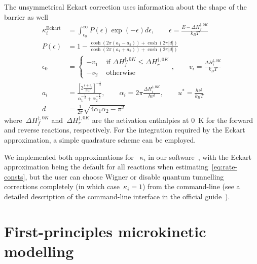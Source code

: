 The unsymmetrical Eckart correction uses information about the shape of the barrier as well
%
\begin{equation}
	\begin{split}
		\kappa_i^\text{Eckart}
		&= \int_{\epsilon_0}^\infty
		P(\epsilon) \exp \left(
		-\epsilon
		\right) d \epsilon,
		\qquad
		\epsilon
		= \frac{E - \Delta H^{\ddagger,
					0 K}_f}{k_B T} \\
		P(\epsilon)
		&= 1
		- \frac{
			\cosh \left(
			2 \pi (a_1 - a_2)
			\right)
			+ \cosh \left(
			2 \pi |d|
			\right)
		}{
			\cosh \left(
			2 \pi (a_1 + a_2)
			\right)
			+ \cosh \left(
			2 \pi |d|
			\right)
		} \\
		\epsilon_0 &= \begin{cases}
			-v_1 & \text{ if }
			\Delta H^{\ddagger,
					0 K}_f \le \Delta H^{\ddagger,
			0 K}_r                   \\
			-v_2 & \text{ otherwise}
		\end{cases},
		\qquad
		v_i
		= \frac{\Delta H^{\ddagger,
					0 K}_i}{k_B T} \\
		a_i
		&= \frac{
			\left[
				2
				\frac{
					\epsilon + v_i
				}{\pi u^*}
				\right]^{-\frac{1}{2}}
		}{
			\alpha_1^{-\frac{1}{2}}
			+ \alpha_2^{-\frac{1}{2}}
		},
		\qquad
		\alpha_i
		= 2 \pi \frac{
			\Delta H^{\ddagger,
					0 K}_i
		}{
			h \nu^\ddagger
		},
		\qquad
		u^*
		= \frac{
			h \nu^\ddagger
		}{
			k_B T
		} \\
		d
		&= \frac{1}{2 \pi}
		\sqrt{
			4 \alpha_1 \alpha_2 - \pi^2
		}
	\end{split}
\end{equation}
%
where~$\Delta H^{\ddagger,
			0 K}_f$ and~$\Delta H^{\ddagger,
			0 K}_r$ are the activation enthalpies at 0~K for the forward and reverse reactions,
respectively.
For the integration required by the Eckart approximation,
a simple quadrature scheme can be employed.

We implemented both approximations for ~$\kappa_i$ in our software~\overreact{},
with the Eckart approximation being the default for all reactions when estimating~\cref{eq:rate-consts},
but the user can choose Wigner or disable quantum tunnelling corrections completely (in which case~$\kappa_i = 1$)
from the command-line (see a detailed description of the command-line interface in the official guide~\cite{overreactguidecli2022}).

\section{First-principles microkinetic modelling}%
\label{sec:microkinetic}

